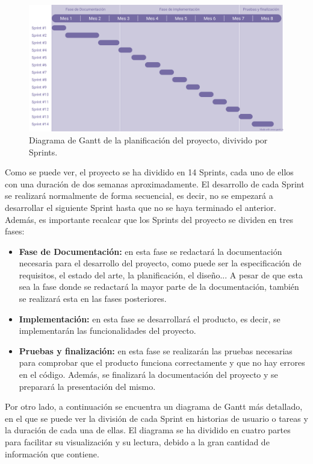 \begin{figure}[H]
    \centering
    \centerline{\includegraphics[width=1\textwidth]{imagenes/c4/gantt.png}}
    \caption{Diagrama de Gantt de la planificación del proyecto, divivido por Sprints.}
    \label{fig:diagrama_gantt}
\end{figure}

Como se puede ver, el proyecto se ha dividido en 14 Sprints, cada uno de ellos con una duración de dos semanas aproximadamente.
El desarrollo de cada Sprint se realizará normalmente de forma secuencial, es decir, no se empezará a desarrollar el siguiente 
Sprint hasta que no se haya terminado el anterior.
Además, es importante recalcar que los Sprints del proyecto se dividen en tres fases:
\begin{itemize}
    \item \textbf{Fase de Documentación:} en esta fase se redactará la documentación necesaria para el desarrollo del proyecto, como puede ser la especificación de requisitos, el estado del arte, la planificación, el diseño...
    A pesar de que esta sea la fase donde se redactará la mayor parte de la documentación, también se realizará esta en las fases posteriores.
    \item \textbf{Implementación:} en esta fase se desarrollará el producto, es decir, se implementarán las funcionalidades del proyecto.
    \item \textbf{Pruebas y finalización:} en esta fase se realizarán las pruebas necesarias para comprobar que el producto funciona correctamente y que no hay errores en el código. Además, se finalizará la documentación del proyecto y se preparará la presentación del mismo.
\end{itemize}


Por otro lado, a continuación se encuentra un diagrama de Gantt más detallado, en el que se puede ver la división de 
cada Sprint en historias de usuario o tareas y la duración de cada una de ellas. El diagrama se ha dividido en cuatro partes
para facilitar su visualización y su lectura, debido a la gran cantidad de información que contiene.


